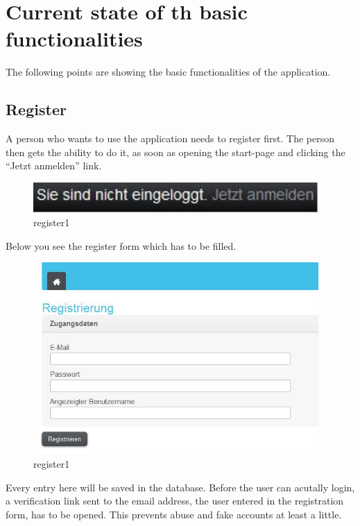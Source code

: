 \section{Current state of th basic functionalities}

The following points are showing the basic functionalities of the application.

\subsection{Register}

A person who wants to use the application needs to register first. The person then gets the ability to do it, as soon as opening the start-page and clicking the \enquote{Jetzt anmelden} link.

\begin{figure}[!ht]
  \centering
    \includegraphics[width=0.97\textwidth]{images/basic_functionalities/reg1.jpg}
  \caption{register1}
  \label{fig:register1}
\end{figure}

Below you see the register form which has to be filled.

\begin{figure}[!ht]
  \centering
    \includegraphics[width=0.97\textwidth]{images/basic_functionalities/register_form.jpg}
  \caption{register1}
  \label{fig:register1}
\end{figure}

Every entry here will be saved in the database. Before the user can acutally login, a verification link sent to the email address, the user entered in the registration form, has to be opened. This prevents abuse and fake accounts at least a little.

